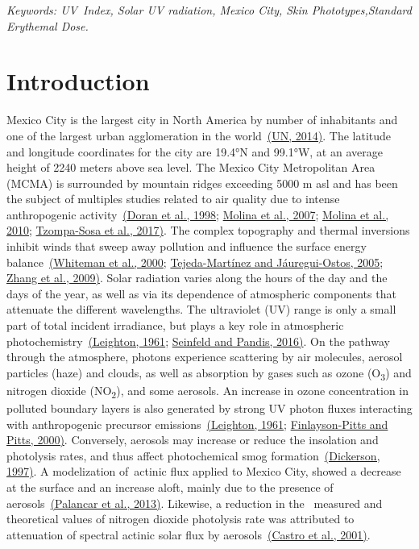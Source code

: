 \documentclass[10pt]{article}
\begin{document}
\sloppy


\emph{Keywords: UV~Index, Solar UV radiation, Mexico City, Skin
Phototypes,Standard Erythemal Dose.}

\section*{Introduction}

{\label{874460}}

Mexico City is the largest city in North America by number of
inhabitants and one of the largest urban agglomeration in the
world~\hyperref[csl:1]{(UN, 2014)}. The latitude and longitude coordinates for the
city are 19.4°N and 99.1°W, at an average height of 2240 meters above
sea level. The Mexico City Metropolitan Area (MCMA) is surrounded by
mountain ridges exceeding 5000 m asl and has been the subject of
multiples studies related to air quality due to intense anthropogenic
activity~\hyperref[csl:2]{(Doran et al., 1998}; \hyperref[csl:3]{Molina et al., 2007}; \hyperref[csl:4]{Molina et al., 2010}; \hyperref[csl:5]{Tzompa-Sosa et al., 2017)}. The complex topography and thermal
inversions inhibit winds that sweep away pollution and influence the
surface energy balance~\hyperref[csl:6]{(Whiteman et al., 2000}; \hyperref[csl:7]{Tejeda-Martínez and Jáuregui-Ostos, 2005}; \hyperref[csl:8]{Zhang et al., 2009)}. Solar radiation varies along
the hours of the day and the days of the year, as well as via its
dependence of atmospheric components that attenuate the different
wavelengths. The ultraviolet (UV) range is only a small part of total
incident irradiance, but plays a key role in atmospheric
photochemistry~\hyperref[csl:9]{(Leighton, 1961}; \hyperref[csl:10]{Seinfeld and Pandis, 2016)}. On the pathway through the
atmosphere, photons experience scattering by air molecules, aerosol
particles (haze) and clouds, as well as absorption by gases such as
ozone (O\textsubscript{3}) and nitrogen dioxide (NO\textsubscript{2}),
and some aerosols. An increase in ozone concentration in polluted
boundary layers is also generated by strong UV photon fluxes interacting
with anthropogenic precursor emissions~\hyperref[csl:9]{(Leighton, 1961}; \hyperref[csl:11]{Finlayson-Pitts and Pitts, 2000)}. Conversely,
aerosols may increase or reduce the insolation and photolysis rates, and
thus affect photochemical smog formation~\hyperref[csl:12]{(Dickerson, 1997)}. A
modelization of~actinic flux applied to Mexico City, showed a decrease
at the surface and an increase aloft, mainly due to the presence of
aerosols~\hyperref[csl:13]{(Palancar et al., 2013)}. Likewise, a reduction in the~ measured and
theoretical values of nitrogen dioxide photolysis rate was attributed to
attenuation of spectral actinic solar flux by
aerosols~\hyperref[csl:14]{(Castro et al., 2001)}.~
\end{document}
